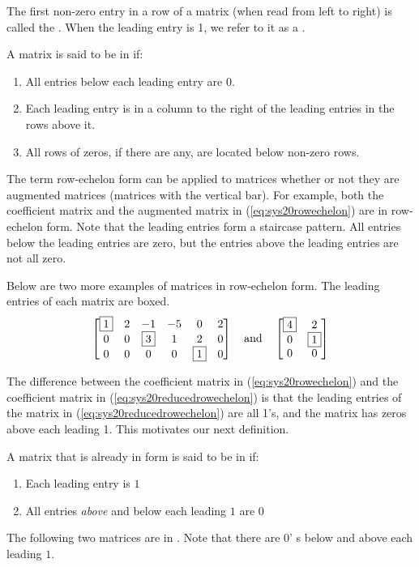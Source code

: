 \documentclass{ximera}
\begin{document}
\begin{definition}\label{def:leadentry} The first non-zero entry in a row of a matrix (when read from left to right) is called the .  When the leading entry is 1, we refer to it as a .
\end{definition}

\begin{definition}\label{def:ref}
A matrix is said to be in  if:
\begin{enumerate}
\item All entries below each leading entry are 0.
\item Each leading entry is in a column to the right of the leading entries in the rows above it.
\item All rows of zeros, if there are any, are located below non-zero rows.
\end{enumerate}
\end{definition}

The term row-echelon form can be applied to matrices whether or not they are augmented matrices (matrices with the vertical bar). For example, both the coefficient matrix and the augmented matrix in (\ref{eq:sys20rowechelon}) are in row-echelon form.  Note that the leading entries form a staircase pattern. All entries below the leading entries are zero, but the entries above the leading entries are not all zero.

Below are two more examples of matrices in row-echelon form.  The leading entries of each matrix are boxed.
$$\begin{bmatrix} 
 \fbox{1}&2&-1&-5&0&2\\0&0&\fbox{3}&1&2&0\\0&0&0&0&\fbox{1}&0
 \end{bmatrix}\quad\text{and}\quad\begin{bmatrix}
 \fbox{4}&2\\0&\fbox{1}\\0&0
 \end{bmatrix}$$
 
 

The difference between the coefficient matrix in  (\ref{eq:sys20rowechelon}) and the coefficient matrix in (\ref{eq:sys20reducedrowechelon}) is that the leading entries of the  matrix in (\ref{eq:sys20reducedrowechelon}) are all 1's, and the matrix has zeros above each leading 1.  This motivates our next definition.

\begin{definition}\label{def:rref}
A matrix that is already in  form is said to be in  if:
\begin{enumerate}
\item Each leading entry is $1$
\item All entries {\it above} and below each leading $1$ are $0$
\end{enumerate}
\end{definition}
The following two matrices are in .  Note that there are $0$'
s below and above each leading $1$.
\end{document}
